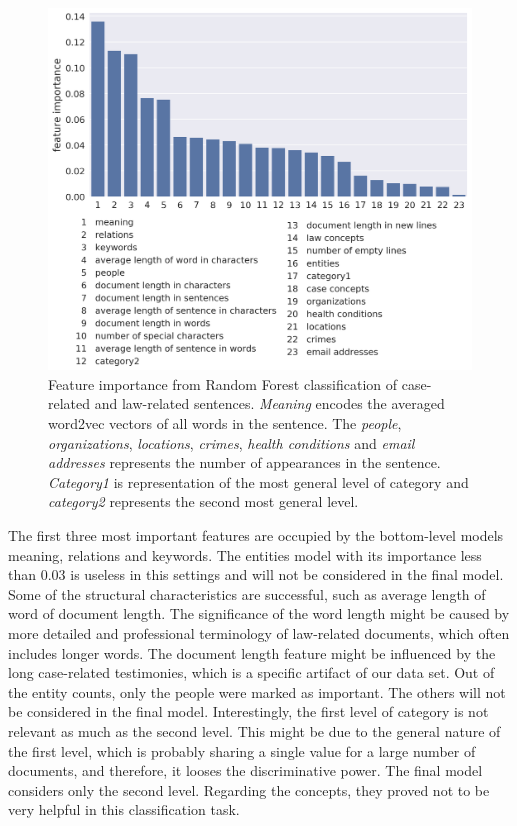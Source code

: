 \documentclass[
  digital, %
  notable,   %
  nolof,     %
  nolot,     %
]{fithesis3}
\begin{document}
\begin{figure}[H]
\caption{Feature importance from Random Forest classification of case-related and law-related sentences. \textit{Meaning} encodes the averaged word2vec vectors of all words in the sentence. The \textit{people}, \textit{organizations}, \textit{locations}, \textit{crimes}, \textit{health conditions} and \textit{email addresses} represents the number of appearances in the sentence. \textit{Category1} is representation of the most general level of category and \textit{category2} represents the second most general level.}
\label{fig:case_law_feature_importance}
\includegraphics[width=\textwidth]{img/case_law_feature_importance}
\end{figure}

The first three most important features are occupied by the bottom-level models meaning, relations and keywords.
The entities model with its importance less than $0.03$ is useless in this settings and will not be considered in the final model.
Some of the structural characteristics are successful, such as average length of word of document length.
The significance of the word length might be caused by more detailed and professional terminology of law-related documents, which often includes longer words.
The document length feature might be influenced by the long case-related testimonies, which is a specific artifact of our data set.
Out of the entity counts, only the people were marked as important.
The others will not be considered in the final model.
Interestingly, the first level of category is not relevant as much as the second level.
This might be due to the general nature of the first level, which is probably sharing a single value for a large number of documents, and therefore, it looses the discriminative power.
The final model considers only the second level.
Regarding the concepts, they proved not to be very helpful in this classification task.
\end{document}
